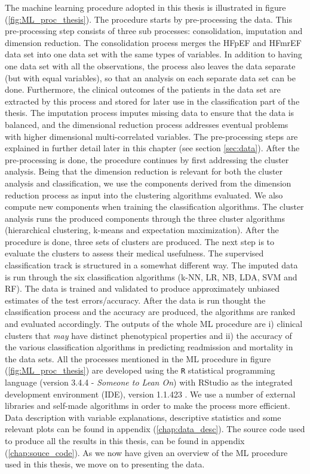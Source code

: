 \documentclass[../thesis.tex]{subfiles}
\begin{document}


\indent The machine learning procedure adopted in this thesis is illustrated in figure (\ref{fig:ML_proc_thesis}). The procedure starts by pre-processing the data. This pre-processing step consists of three sub processes: consolidation, imputation and dimension reduction. The consolidation process merges the HFpEF and HFmrEF data set into one data set with the same types of variables. In addition to having one data set with all the observations, the process also leaves the data separate (but with equal variables), so that an analysis on each separate data set can be done. Furthermore, the clinical outcomes of the patients in the data set are extracted by this process and stored for later use in the classification part of the thesis. The imputation process imputes missing data to ensure that the data is balanced, and the dimensional reduction process addresses eventual problems with higher dimensional multi-correlated variables. The pre-processing steps are explained in further detail later in this chapter (see section \ref{sec:data}). After the pre-processing is done, the procedure continues by first addressing the cluster analysis. Being that the dimension reduction is relevant for both the cluster analysis and classification, we use the components derived from the dimension reduction process as input into the clustering algorithms evaluated. We also compute new components when training the classification algorithms. The cluster analysis runs the produced components through the three cluster algorithms (hierarchical clustering, k-means and expectation maximization). After the procedure is done, three sets of clusters are produced. The next step is to evaluate the clusters to assess their medical usefulness. The supervised classification track is structured in a somewhat different way. The imputed data is run through the six classification algorithms (k-NN, LR, NB, LDA, SVM and RF). The data is trained and validated to produce approximately unbiased estimates of the test errors/accuracy. After the data is run thought the classification process and the accuracy are produced, the algorithms are ranked and evaluated accordingly. The outputs of the whole ML procedure are i) clinical clusters that \textit{may} have distinct phenotypical properties and ii) the accuracy of the various classification algorithms in predicting readmission and mortality in the data sets. All the processes mentioned in the ML procedure in figure (\ref{fig:ML_proc_thesis}) are developed using the \texttt{R} statistical programming language (version 3.4.4 - \textit{Someone to Lean On}) \citep{Rsoftware2018} with RStudio as the integrated development environment (IDE), version 1.1.423 \citep{RStudio2018}. We use a number of external libraries and self-made algorithms in order to make the process more efficient. Data description with variable explanations, descriptive statistics and some relevant plots can be found in appendix (\ref{chap:data_desc}). The source code used to produce all the results in this thesis, can be found in appendix (\ref{chap:souce_code}). As we now have given an overview of the ML procedure used in this thesis, we move on to presenting the data.
\end{document}
